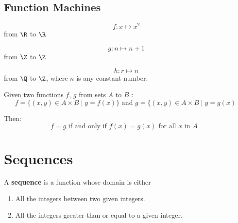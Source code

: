 \documentclass[11pt]{article}
\newcommand*\from{\colon}
\newcommand\fn[3]{#1 \from #2 \mapsto #3}
\begin{document}
\subsection{Function Machines}

\begin{definition}\label{def:sqr-fn}
    \begin{equation*}
        \fn{f}{x}{x^2}
    \end{equation*}
    from $\R$ to $\R$
\end{definition}

\begin{definition}\label{def:succ-fn}
    \begin{equation*}
        \fn{g}{n}{n + 1}
    \end{equation*}
    from $\Z$ to $\Z$
\end{definition}

\begin{definition}\label{def:const-fn}
    \begin{equation*}
        \fn{h}{r}{n}
    \end{equation*}
    from $\Q$ to $\Z$, where $n$ is any constant number.
\end{definition}

\begin{definition}\label{def:function-equality}
    Given two functions $f$, $g$ from sets $A$ to $B$ :
    \begin{equation*}
        f = \{ (x,y) \in A \times B \mid y = f(x) \} \text{ and } g = \{ (x,y) \in A \times B \mid y = g(x) \
    \end{equation*}
    
    Then:
    \begin{equation*}
        f = g \text{ if and only if } f(x) = g(x) \text{ for all $x$ in $A$ }
    \end{equation*}
\end{definition}

\section{Sequences}

\begin{definition}[Sequence]\label{def:sequence}
    A \textbf{sequence} is a function whose domain is either 
    \begin{enumerate}
        \item All the integers between two given integers.
        \item All the integers greater than or equal to a given integer.
    \end{enumerate}
    

    
\end{definition}
\end{document}

